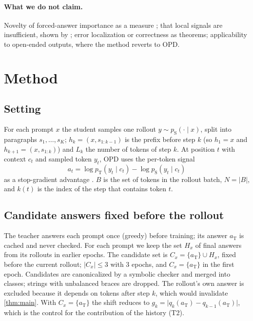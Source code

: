 \documentclass[11pt]{article}
\theoremstyle{definition}
\theoremstyle{remark}
\newcommand{\pT}{p_{\mathrm{T}}}
\newcommand{\pS}{p_{\mathrm{S}}}
\newcommand{\aT}{a_{\mathrm{T}}}
\begin{document}
\paragraph{What we do not claim.}
Novelty of forced-answer importance as a measure \citep{lanham2023measuring,bogdan2025thought}; that local signals are insufficient, shown by \citet{ma2026outcome}; error localization or correctness as theorems; applicability to open-ended outputs, where the method reverts to OPD.

\section{Method}
\label{sec:method}

\subsection{Setting}
For each prompt $x$ the student samples one rollout $y\sim\pS(\cdot\mid x)$, split into paragraphs $s_1,\dots,s_K$; $h_k=(x,s_{1:k-1})$ is the prefix before step $k$ (so $h_1=x$ and $h_{k+1}=(x,s_{1:k})$) and $L_k$ the number of tokens of step $k$. At position $t$ with context $c_t$ and sampled token $y_t$, OPD uses the per-token signal
\begin{equation}
a_t=\log\pT(y_t\mid c_t)-\log\pS(y_t\mid c_t)
\label{eq:adv}
\end{equation}
as a stop-gradient advantage \citep{lu2025opd}. $B$ is the set of tokens in the rollout batch, $N=|B|$, and $k(t)$ is the index of the step that contains token $t$.

\subsection{Candidate answers fixed before the rollout}
\label{sec:candidates}
The teacher answers each prompt once (greedy) before training; its answer $\aT$ is cached and never checked. For each prompt we keep the set $H_x$ of final answers from its rollouts in earlier epochs. The candidate set is $C_x=\{\aT\}\cup H_x$, fixed before the current rollout; $\lvert C_x\rvert\le3$ with 3 epochs, and $C_x=\{\aT\}$ in the first epoch. Candidates are canonicalized by a symbolic checker and merged into classes; strings with unbalanced braces are dropped. The rollout's own answer is excluded because it depends on tokens after step $k$, which would invalidate \cref{thm:main}. With $C_x=\{\aT\}$ the shift reduces to $g_k=\lvert q_k(\aT)-q_{k-1}(\aT)\rvert$, which is the control for the contribution of the history (T2).
\end{document}
